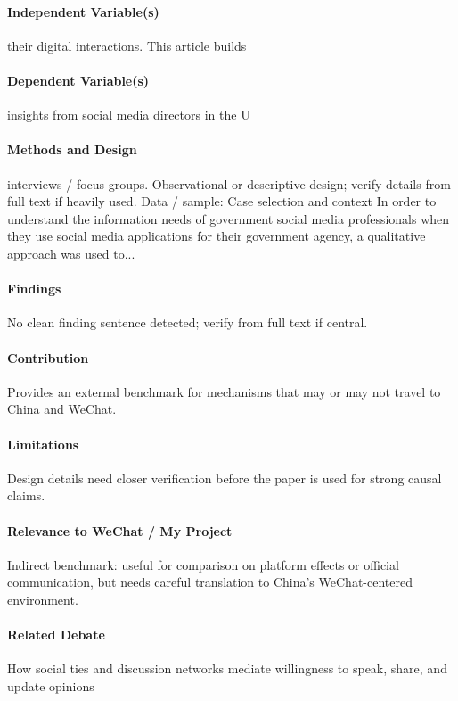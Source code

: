 \documentclass[12pt]{article}
\begin{document}
\paragraph{Independent Variable(s)} their digital interactions. This article builds

\paragraph{Dependent Variable(s)} insights from social media directors in the U

\paragraph{Methods and Design} interviews / focus groups. Observational or descriptive design; verify details from full text if heavily used. Data / sample: Case selection and context In order to understand the information needs of government social media professionals when they use social media applications for their government agency, a qualitative approach was used to...

\paragraph{Findings} No clean finding sentence detected; verify from full text if central.

\paragraph{Contribution} Provides an external benchmark for mechanisms that may or may not travel to China and WeChat.

\paragraph{Limitations} Design details need closer verification before the paper is used for strong causal claims.

\paragraph{Relevance to WeChat / My Project} Indirect benchmark: useful for comparison on platform effects or official communication, but needs careful translation to China's WeChat-centered environment.

\paragraph{Related Debate} How social ties and discussion networks mediate willingness to speak, share, and update opinions
\end{document}

